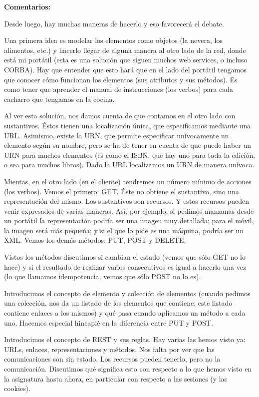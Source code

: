 \textbf{Comentarios:}

Desde luego, hay muchas maneras de hacerlo y eso favorecerá el debate.

Una primera idea es modelar los elementos como objetos (la nevera, los alimentos, etc.) y hacerlo llegar de alguna manera al otro lado de la red, donde está mi portátil (esta es una solución que siguen muchos web services, o incluso CORBA). Hay que entender que esto hará que en el lado del portátil tengamos que conocer cómo funcionan los elementos (sus atributos y sus métodos). Es como tener que aprender el manual de instrucciones (los verbos) para cada cacharro que tengamos en la cocina.

Al ver esta solución, nos damos cuenta de que contamos en el otro lado con sustantivos. Éstos tienen una localización única, que especificamos mediante una URL. Asimismo, existe la URN, que permite especificar unívocamente un elemento según su nombre, pero se ha de tener en cuenta de que puede haber un URN para muchos elementos (es como el ISBN, que hay uno para toda la edición, o sea para muchos libros). Dado la URL localizamos un URN de manera unívoca.

Mientas, en el otro lado (en el cliente) tendremos un número mínimo de acciones (los verbos). Vemos el primero: GET. Éste no obtiene el sustantivo, sino una representación del mismo. Los sustantivos son recursos. Y estos recursos pueden venir expresados de varias maneras. Así, por ejemplo, si pedimos manzanas desde un portátil la representación podría ser una imagen muy detallada; para el móvil, la imagen será más pequeña; y si el que lo pide es una máquina, podría ser un XML. Vemos los demás métodos: PUT, POST y DELETE.

Vistos los métodos discutimos si cambian el estado (vemos que sólo GET no lo hace) y si el resultado de realizar varios consecutivos es igual a hacerlo una vez (lo que llamamos idempotencia, vemos que sólo POST no lo es).

Introducimos el concepto de elemento y colección de elementos (cuando pedimos una colección, nos da un listado de los elementos que contiene; este listado contiene enlaces a los mismos) y qué pasa cuando aplicamos un método a cada uno. Hacemos especial hincapié en la diferencia entre PUT y POST.

Introducimos el concepto de REST y sus reglas. Hay varias las hemos visto ya: URLs, enlaces, representaciones y métodos. Nos falta por ver que las comunicaciones son sin estado. Los recursos pueden tenerlo, pero no la comunicación. Discutimos qué significa esto con respecto a lo que hemos visto en la asignatura hasta ahora, en particular con respecto a las sesiones (y las cookies).


